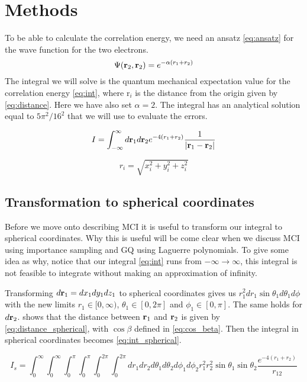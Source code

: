 \section{Methods}
To be able to calculate the correlation energy, we need an ansatz
\cref{eq:ansatz} for the wave function for the two electrons.
\begin{equation}\label{eq:ansatz}
  \Psi(\mathbf{r}_2, \mathbf{r}_2) = e^{-\alpha(r_1 + r_2)}
\end{equation}
The integral we will solve is the quantum
mechanical expectation value for the correlation energy \cref{eq:int},
where r$_i$ is the distance from the origin given by \cref{eq:distance}.
Here we have also set $\alpha = 2$. The integral has an analytical solution
equal to $5\pi^2/16^2$ that we will use to evaluate the errors.

\begin{equation}
  \label{eq:int}
  I = \int_{-\infty}^{\infty} d\mathbf{r}_1 d\mathbf{r}_2 e^{-4(r_1+r_2)}
  \frac{1}{\abs{\mathbf{r}_1 - \mathbf{r}_2}}
\end{equation}

\begin{equation}
  \label{eq:distance}
r_i = \sqrt{x_i^2 + y_i^2 + z_i^2}
\end{equation}

\subsection{Transformation to spherical coordinates}
Before we move onto describing MCI it is useful to transform our integral to
spherical coordinates. Why this is useful will be come clear when we discuss
MCI using importance sampling and GQ using Laguerre polynomials. To give some idea
as why, notice that our integral \cref{eq:int} runs from $-\infty \to \infty$,
this integral is not feasible to integrate without making an approximation of infinity.

Transforming $d\mathbf{r}_1 = dx_1dy_1dz_1$ to spherical coordinates gives us
$r_1^2 dr_1 \sin{\theta_1}d\theta_1 d\phi$ with the new limits $r_1 \in [0, \infty)$,
 $\theta_1 \in [0, 2\pi]$ and $\phi_1 \in [0,\pi]$. The same holds for $d\mathbf{r}_2$.
\parencite{lectures} shows that the distance between $\mathbf{r}_1$ and $\mathbf{r}_2$ is given by
\cref{eq:distance_spherical}, with $\cos{\beta}$ defined in \cref{eq:cos_beta}.
Then the integral in spherical coordinates becomes \cref{eq:int_spherical}.

\begin{equation}
  \label{eq:int_spherical}
  I_s = \int_{0}^{\infty} \int_{0}^{\infty} \int_{0}^{\pi} \int_{0}^{\pi}
  \int_{0}^{2\pi} \int_{0}^{2\pi}
  dr_1 dr_2 d\theta_1 d\theta_2 d\phi_1 d\phi_2
  r_1^2 r_2^2 \sin{\theta_1} \sin{\theta_2} \frac{e^{-4(r_1 + r_2)}}{r_{12}}
\end{equation}

